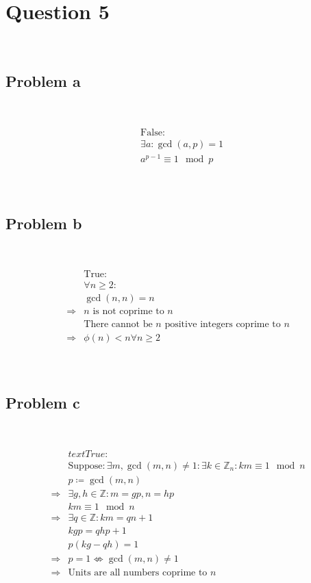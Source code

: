 \documentclass{article}
\begin{document}
\newpage

\section*{Question 5}

~

\subsection*{Problem a}

~

\begin{align*}
    &\text{False}:\\
    &\exists a:\gcd(a,p)=1\\
    &a^{p-1}\equiv 1\mod p\\
\end{align*}

~

\subsection*{Problem b}

~

\begin{align*}
    &\text{True}:\\
    &\forall n\geqslant 2:\\
    &\gcd(n,n)=n\\
    \Rightarrow&n\text{ is not coprime to }n\\
    &\text{There cannot be }n\text{ positive integers coprime to }n\\
    \Rightarrow&\phi(n)<n\forall n\geqslant 2\\
\end{align*}

~

\subsection*{Problem c}

~

\begin{align*}
    &text{True}:\\
    &\text{Suppose}:\exists m,\gcd(m,n)\ne 1:\exists k\in\mathbb{Z} _n:km\equiv 1\mod n\\
    &p\coloneqq \gcd(m,n)\\
    \Rightarrow&\exists g,h\in\mathbb{Z} :m=gp,n=hp\\
    &km\equiv 1\mod n\\
    \Rightarrow&\exists q\in\mathbb{Z} :km=qn+1\\
    &kgp=qhp+1\\
    &p(kg-qh)=1\\
    \Rightarrow&p=1\nLeftrightarrow\gcd(m,n)\ne 1\\
    \Rightarrow&\text{Units are all numbers coprime to }n\\
\end{align*}
\end{document}
